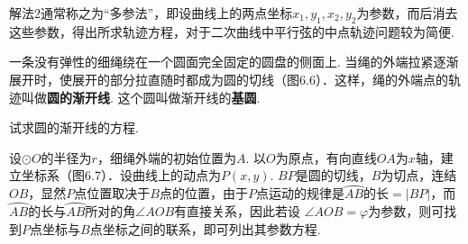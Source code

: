 \begin{remark}
解法2通常称之为“多参法”，即设曲线上的两点坐标$x_1,y_1,x_2,y_2$为参数，而后消去这些参数，得出所求轨迹方程，对于二次曲线中平行弦的中点轨迹问题较为简便.
\end{remark}

\noindent
\begin{minipage}{.4\textwidth}\CTEXindent
    \begin{example}
        一条没有弹性的细绳绕在一个圆面完全固定的圆盘的侧面上. 当绳的外端拉紧逐渐展开时，使展开的部分拉直随时都成为圆的切线（图6.6）．这样，绳的外端点的轨迹叫做\textbf{圆的渐开线}. 这个圆叫做渐开线的\textbf{基圆}.
        
        试求圆的渐开线的方程.
        \end{example}
\end{minipage}\hfill
\begin{minipage}{.57\textwidth}
    \centering
{}    
\end{minipage}



\begin{analyze}
设$\odot O$的半径为$r$，细绳外端的初始位置为$A$. 以$O$为原点，有向直线$OA$为$x$轴，建立坐标系（图6.7）．设曲线上的动点为$P(x,y)$. $BP$是圆的切线，$B$为切点，连结$OB$，显然$P$点位置取决于$B$点的位置，由于$P$点运动的规律是$\wideparen{AB}\text{的长}=|BP|$，而$\wideparen{AB}$的长与$\wideparen{AB}$所对的角$\angle AOB$有直接关系，因此若设
$\angle AOB=\varphi$为参数，则可找到$P$点坐标与$B$点坐标之间的联系，即可列出其参数方程.
\end{analyze}

